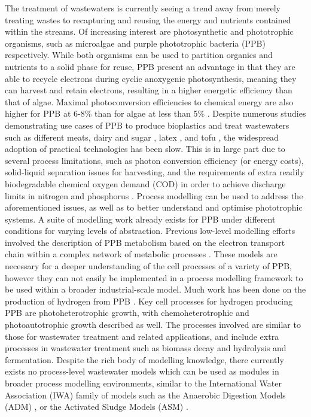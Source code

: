 The treatment of wastewaters is currently seeing a trend away from merely treating wastes to recapturing and reusing the energy and nutrients contained within the streams. Of increasing interest are photosynthetic and phototrophic organisms, such as microalgae \cite{ward2014} and purple phototrophic bacteria (PPB) \cite{hulsen2014} respectively. While both organisms can be used to partition organics and nutrients to a solid phase for reuse, PPB present an advantage in that they are able to recycle electrons during cyclic anoxygenic photosynthesis, meaning they can harvest and retain electrons, resulting in a higher energetic efficiency than that of algae. Maximal photoconversion efficiencies to chemical energy are also higher for PPB at 6-8\% \cite{miyake1987} than for algae at less than 5\% \cite{posten2009}. Despite numerous studies demonstrating use cases of PPB to produce bioplastics \cite{melnicki2009} and treat wastewaters such as different meats, dairy and sugar \cite{hulsen2018}, latex \cite{kantachote2005}, and tofu \cite{zhu1999}, the widespread adoption of practical technologies has been slow. This is in large part due to several process limitations, such as photon conversion efficiency (or energy costs), solid-liquid separation issues for harvesting, and the requirements of extra readily biodegradable chemical oxygen demand (COD) in order to achieve discharge limits in nitrogen and phosphorus \cite{hulsen2015}.
\skippingparagraph
Process modelling can be used to address the aforementioned issues, as well as to better understand and optimise phototrophic systems. A suite of modelling work already exists for PPB under different conditions for varying levels of abstraction. Previous low-level modelling efforts involved the description of PPB metabolism based on the electron transport chain within a complex network of metabolic processes \cite{golomysova2010}. These models are necessary for a deeper understanding of the cell processes of a variety of PPB, however they can not easily be implemented in a process modelling framework to be used within a broader industrial-scale model. Much work has been done on the production of hydrogen from PPB \cite{eroglu2008}. Key cell processes for hydrogen producing PPB are photoheterotrophic growth, with chemoheterotrophic and photoautotrophic growth described as well. The processes involved are similar to those for wastewater treatment and related applications, and include extra processes in wastewater treatment such as biomass decay and hydrolysis and fermentation. Despite the rich body of modelling knowledge, there currently exists no process-level wastewater models which can be used as modules in broader process modelling environments, similar to the International Water Association (IWA) family of models \cite{henze1987} such as the Anaerobic Digestion Models (ADM) \cite{batstone2002}, or the Activated Sludge Models (ASM) \cite{gujer1999}. 
